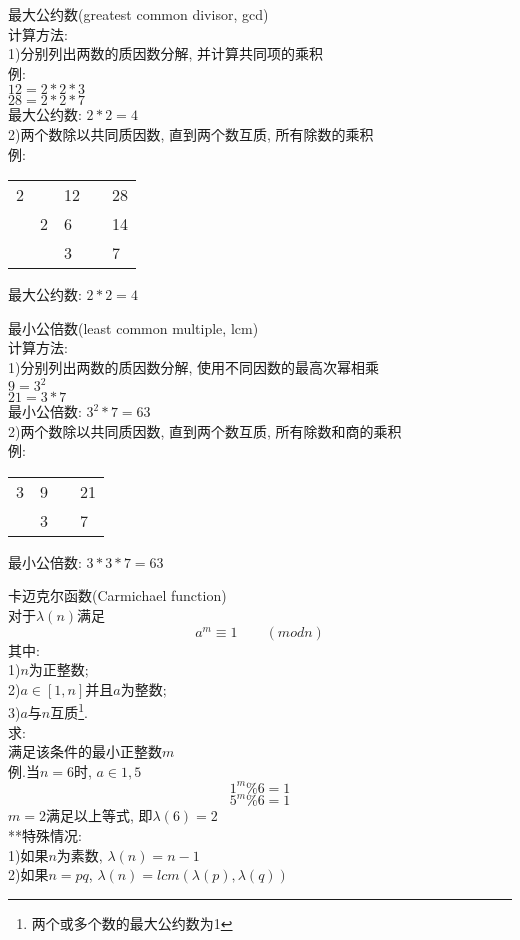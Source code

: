 \documentclass[UTF8, fontset=ubuntu]{ctexart}
\begin{document}
最大公约数(greatest common divisor, gcd)\\
计算方法: \\
1)分别列出两数的质因数分解, 并计算共同项的乘积\\
例:\\
$12=2*2*3$\\
$28=2*2*7$\\
最大公约数: $2*2=4$\\[1ex]

2)两个数除以共同质因数, 直到两个数互质, 所有除数的乘积\\
例:\\
\begin{table}[H]
\begin{tabular}{lllll}
\multicolumn{1}{l|}{2} &                        & 12 &  & 28 \\ \cline{2-5} 
                       & \multicolumn{1}{l|}{2} & 6  &  & 14 \\ \cline{3-5} 
                       &                        & 3  &  & 7 
\end{tabular}
\end{table}
最大公约数: $2*2=4$
\newpage

最小公倍数(least common multiple, lcm)\\
计算方法:\\
1)分别列出两数的质因数分解, 使用不同因数的最高次幂相乘\\
$9=3^2$\\
$21=3*7$\\
最小公倍数: $3^2*7=63$\\[1ex]

2)两个数除以共同质因数, 直到两个数互质, 所有除数和商的乘积\\
例:\\
\begin{table}[H]
\begin{tabular}{llll}
\multicolumn{1}{l|}{3} & 9 &  & 21 \\ \cline{2-4}
                       & 3 &  & 7
\end{tabular}
\end{table}
最小公倍数: $3*3*7=63$
\newpage

卡迈克尔函数(Carmichael function)\\
对于$\lambda(n)$满足\\
\[a^m\equiv 1\qquad (mod n)\]
其中:\\
\phantom{\qquad}1)$n$为正整数;\\
\phantom{\qquad}2)$a\in[1,n]$并且$a$为整数;\\
\phantom{\qquad}3)$a$与$n$互质\footnote{两个或多个数的最大公约数为1}.\\
求:\\
\phantom{\qquad}满足该条件的最小正整数$m$\\[2ex]

例.当$n=6$时, $a\in{1,5}$\\
\[1^m\%6=1\]
\[5^m\%6=1\]
$m=2$满足以上等式, 即$\lambda(6)=2$\\
**特殊情况:\\
1)如果$n$为素数, $\lambda(n)=n-1$\\
2)如果$n=pq$, $\lambda(n)=lcm(\lambda(p),\lambda(q))$
\end{document}
